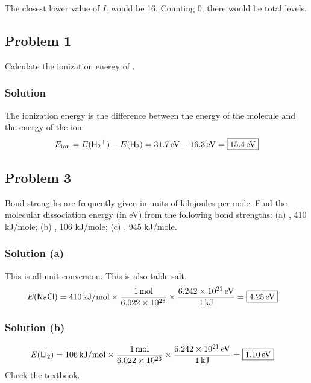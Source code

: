 \documentclass[12pt]{article}
\newcommand{\E}[1]{\times 10^{#1}}
\begin{document}
            The closest lower value of $L$ would be 16.
            Counting $0$, there would be  total levels.
    
    \pagebreak
    \subsection{Problem 1}
        Calculate the ionization energy of .

        \subsubsection{Solution}
            The ionization energy is the difference between the energy of the molecule and the energy of the ion.
            \begin{equation}
                E_{\rm ion} =   E(\ce{H2+}) - E(\ce{H2})
                    =   31.7\,\unit{\eV} - 16.3\,\unit{\eV}
                    =   \boxed{15.4\,\unit{\eV}}
            \end{equation}
        
    \subsection{Problem 3}
        Bond strengths are frequently given in units of kilojoules per mole.
        Find the molecular dissociation energy (in eV) from the following bond strengths: (a) , 410 kJ/mole; (b) , 106 kJ/mole; (c) , 945 kJ/mole.

        \subsubsection{Solution (a)}
            This is all unit conversion.
            This is also table salt.
            \begin{align}
                E(\ce{NaCl})    &=  410\,\unit{\kilo\joule/\mole} \times \frac{1\,\unit{\mole}}{6.022\E{23}} \times \frac{6.242\E{21}\,\unit{\eV}}{1\,\unit{\kilo\joule}}
                    =   \boxed{4.25\,\unit{\eV}}
            \end{align}

        \subsubsection{Solution (b)}
            \begin{align}
                E(\ce{Li2}) &=  106\,\unit{\kilo\joule/\mole} \times \frac{1\,\unit{\mole}}{6.022\E{23}} \times \frac{6.242\E{21}\,\unit{\eV}}{1\,\unit{\kilo\joule}}
                    =   \boxed{1.10\,\unit{\eV}}
            \end{align}
            Check the textbook.
\end{document}
